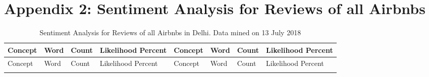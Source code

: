 \documentclass[a4paper, 12pt]{article}
\begin{document}
\begin{longtable}[c]{>{\raggedright}p{5.5cm}>{\raggedright}p{2cm}p{5.5cm}>{\raggedright\arraybackslash}p{2cm}}
\end{longtable}

\newpage






 \section*{Appendix 2: Sentiment Analysis for Reviews of all Airbnbs}

\footnotesize
\begin{longtable}[l]{p{2cm}p{2cm}p{1cm}p{1.6cm}p{2.4cm}p{1.9cm}p{1cm}p{2cm}}
\caption{Sentiment Analysis for Reviews of all Airbnbs in Delhi. Data mined on 13 July 2018} \\
\toprule
Concept & Word & Count & Likelihood Percent & Concept & Word & Count & Likelihood Percent \\
\midrule
\endfirsthead
Concept & Word & Count & Likelihood Percent & Concept & Word & Count & Likelihood Percent \\
\midrule
\endhead
\endfoot
\endlastfoot \\


\end{longtable}
\end{document}
